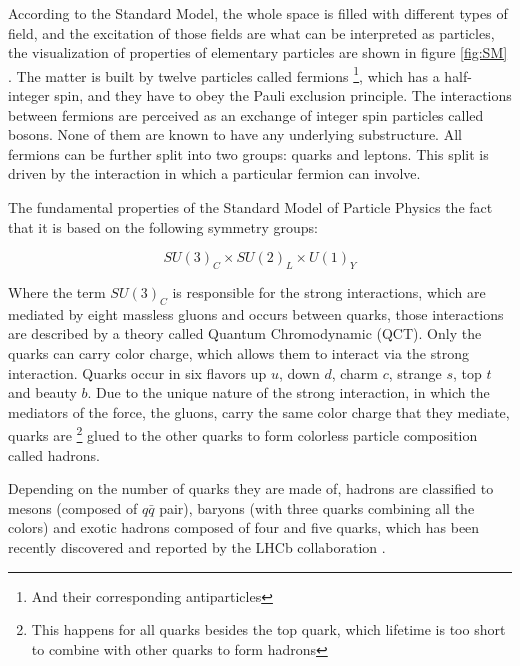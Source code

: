 According to the Standard Model, the whole space is filled with different types of field, and the excitation of those fields are what can be interpreted as particles, the visualization of properties of elementary particles are shown in figure \ref{fig:SM} . The matter is built by twelve particles called fermions \footnote{And their corresponding antiparticles}, which has a half-integer spin, and they have to obey the Pauli exclusion principle. The interactions between fermions are perceived as an exchange of integer spin particles called bosons. 
None of them are known to have any underlying substructure.
All fermions can be further split into two groups: quarks and leptons. This split is driven by the interaction in which a particular fermion can involve. 


The fundamental properties of the Standard Model of Particle Physics the fact that it is based on the following symmetry groups:

\begin{equation}
    SU(3)_C \times SU(2)_L \times U(1)_Y
\end{equation}



Where the term $SU(3)_C$ is responsible for the strong interactions, which are mediated by eight massless gluons and occurs between quarks, those interactions are described by a theory called Quantum Chromodynamic (QCT).  Only the quarks can carry color charge, which allows them to interact via the strong interaction. Quarks occur in six flavors up $u$,  down $d$, charm $c$, strange $s$, top $t$ and beauty $b$.  Due to the unique nature of the strong interaction, in which the mediators of the force, the gluons, carry the same color charge that they mediate, quarks are \footnote{This happens for all quarks besides the top quark, which lifetime is too short to combine with other quarks to form hadrons} glued to the other quarks to form colorless particle composition called hadrons. 

Depending on the number of quarks they are made of, hadrons are classified to mesons (composed of $q\bar{q}$ pair), baryons (with three quarks combining all the colors) and exotic hadrons composed of four and five quarks, which has been recently discovered and reported by the LHCb collaboration \cite{pentaquarks}.  



